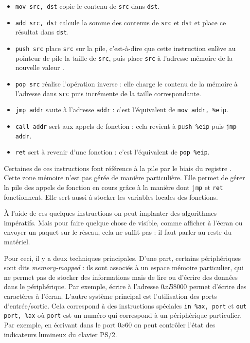 \begin{itemize}

\item \texttt{mov src, dst} copie le contenu de \texttt{src} dans \texttt{dst}.

\item \texttt{add src, dst} calcule la somme des contenus de \texttt{src} et
  \texttt{dst} et place ce résultat dans \texttt{dst}.

\item \texttt{push src} place \texttt{src} sur la pile, c'est-à-dire que cette
  instruction enlève au pointeur de pile \esp la taille de \texttt{src}, puis
  place \texttt{src} à l'adresse mémoire de la nouvelle valeur \esp.

\item \texttt{pop src} réalise l'opération inverse : elle charge le contenu de
  la mémoire à l'adresse \esp dans \texttt{src} puis incrémente \esp de la
  taille correspondante.

\item \texttt{jmp addr} saute à l'adresse \texttt{addr} : c'est l'équivalent de
  \texttt{mov addr, \%eip}.

\item \texttt{call addr} sert aux appels de fonction : cela revient à
  \texttt{push \%eip} puis \texttt{jmp addr}.

\item \texttt{ret} sert à revenir d'une fonction : c'est l'équivalent de
  \texttt{pop \%eip}.

\end{itemize}

Certaines de ces instructions font référence à la pile par le biais du registre
\esp. Cette zone mémoire n'est pas gérée de manière particulière. Elle permet de
gérer la pile des appels de fonction en cours grâce à la manière dont
\texttt{jmp} et \texttt{ret} fonctionnent. Elle sert aussi à stocker les
variables locales des fonctions.

À l'aide de ces quelques instructions on peut implanter des algorithmes
impératifs. Mais pour faire quelque chose de visible, comme afficher à l'écran
ou envoyer un paquet sur le réseau, cela ne suffit pas : il faut parler au reste
du matériel.

Pour ceci, il y a deux techniques principales. D'une part, certains
périphériques sont dits \emph{memory-mapped} : ils sont associés à un espace
mémoire particulier, qui ne permet pas de stocker des informations mais de lire
ou d'écrire des données dans le périphérique. Par exemple, écrire à l'adresse
$0xB8000$ permet d'écrire des caractères à l'écran. L'autre système principal
est l'utilisation des ports d'entrée/sortie. Cela correspond à des instructions
spéciales \texttt{in \%ax, port} et \texttt{out port, \%ax} où \texttt{port}
est un numéro qui correspond à un périphérique particulier. Par exemple, en
écrivant dans le port $0x60$ on peut contrôler l'état des indicateurs lumineux
du clavier PS/2.

